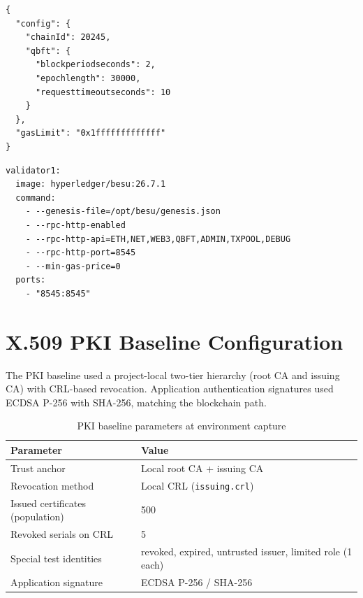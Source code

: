 \begin{lstlisting}[style=json,caption={QBFT genesis excerpt (\texttt{besu/network/genesis.json})},label=lst:genesis]
{
  "config": {
    "chainId": 20245,
    "qbft": {
      "blockperiodseconds": 2,
      "epochlength": 30000,
      "requesttimeoutseconds": 10
    }
  },
  "gasLimit": "0x1fffffffffffff"
}
\end{lstlisting}

\begin{lstlisting}[style=yaml,caption={Validator service excerpt (\texttt{besu/docker-compose.yml})},label=lst:docker-compose]
validator1:
  image: hyperledger/besu:26.7.1
  command:
    - --genesis-file=/opt/besu/genesis.json
    - --rpc-http-enabled
    - --rpc-http-api=ETH,NET,WEB3,QBFT,ADMIN,TXPOOL,DEBUG
    - --rpc-http-port=8545
    - --min-gas-price=0
  ports:
    - "8545:8545"
\end{lstlisting}

\section{X.509 PKI Baseline Configuration}
\label{app:pki-config}

The PKI baseline used a project-local two-tier hierarchy (root CA and issuing CA) with CRL-based revocation. Application authentication signatures used ECDSA P-256 with SHA-256, matching the blockchain path.

\begin{table}[htbp]
    \centering
    \caption{PKI baseline parameters at environment capture}
    \label{tab:app-pki-params}
    \begin{tabular}{|l|l|}
        \hline
        \textbf{Parameter} & \textbf{Value} \\
        \hline
        Trust anchor & Local root CA + issuing CA \\
        \hline
        Revocation method & Local CRL (\texttt{issuing.crl}) \\
        \hline
        Issued certificates (population) & 500 \\
        \hline
        Revoked serials on CRL & 5 \\
        \hline
        Special test identities & revoked, expired, untrusted issuer, limited role (1 each) \\
        \hline
        Application signature & ECDSA P-256 / SHA-256 \\
        \hline
    \end{tabular}
\end{table}

